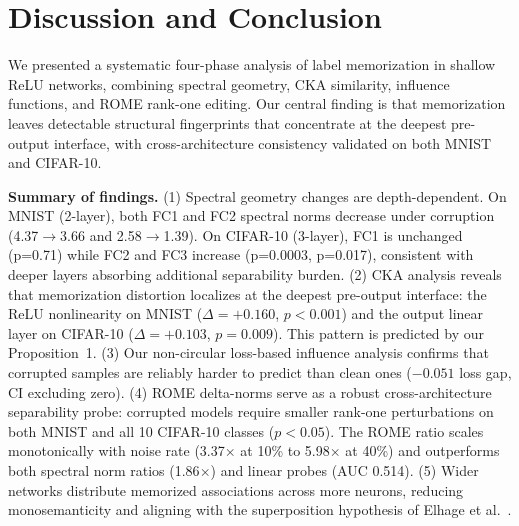 \documentclass{article}
\begin{document}
\section{Discussion and Conclusion}
\label{sec:discussion}

We presented a systematic four-phase analysis of label memorization in shallow ReLU networks, combining spectral geometry, CKA similarity, influence functions, and ROME rank-one editing. Our central finding is that memorization leaves detectable structural fingerprints that concentrate at the deepest pre-output interface, with cross-architecture consistency validated on both MNIST and CIFAR-10.

\textbf{Summary of findings.} (1) Spectral geometry changes are depth-dependent. On MNIST (2-layer), both FC1 and FC2 spectral norms decrease under corruption (4.37$\to$3.66 and 2.58$\to$1.39). On CIFAR-10 (3-layer), FC1 is unchanged (p=0.71) while FC2 and FC3 increase (p=0.0003, p=0.017), consistent with deeper layers absorbing additional separability burden. (2) CKA analysis reveals that memorization distortion localizes at the deepest pre-output interface: the ReLU nonlinearity on MNIST ($\Delta=+0.160$, $p<0.001$) and the output linear layer on CIFAR-10 ($\Delta=+0.103$, $p=0.009$). This pattern is predicted by our Proposition~1. (3) Our non-circular loss-based influence analysis confirms that corrupted samples are reliably harder to predict than clean ones ($-0.051$ loss gap, CI excluding zero). (4) ROME delta-norms serve as a robust cross-architecture separability probe: corrupted models require smaller rank-one perturbations on both MNIST and all 10 CIFAR-10 classes ($p<0.05$). The ROME ratio scales monotonically with noise rate (3.37$\times$ at 10\% to 5.98$\times$ at 40\%) and outperforms both spectral norm ratios (1.86$\times$) and linear probes (AUC 0.514). (5) Wider networks distribute memorized associations across more neurons, reducing monosemanticity and aligning with the superposition hypothesis of Elhage et al.~\cite{elhage2022toy}.
\end{document}
